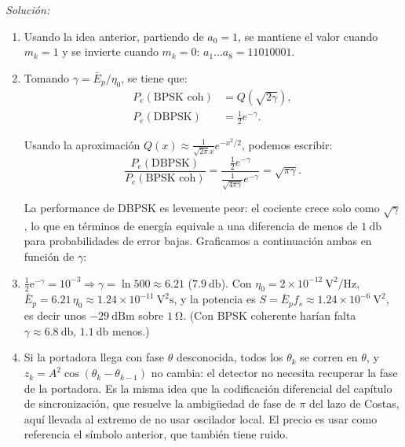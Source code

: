 \documentclass[a4paper,11pt]{article}
\newcommand{\e}{\mathrm{e}}
\newenvironment{solucion}[1][]{
\noindent \large \textsl{Solución:} \ifthenelse{\equal{#1}{}}{}{\emph{(#1)}}

\smallskip
}{
\bigskip
}
\begin{document}
\begin{solucion}
\begin{enumerate}
                \item Usando la idea anterior, partiendo de $a_0=1$, se mantiene el valor cuando $m_k=1$ y se invierte cuando $m_k=0$: $a_1\ldots a_8 = 11010001$.
                
                \item Tomando $\gamma = \bar{E}_p/\eta_0$, se tiene que:
                 \begin{align*}
                        P_e(\text{BPSK coh}) &= Q(\sqrt{2\gamma}), \\
                        P_e(\text{DBPSK} ) &= \frac{1}{2} e^{-\gamma}.
                 \end{align*}
                
                 Usando la aproximación $Q(x) \approx \frac{1}{\sqrt{2\pi} x}e^{-x^2/2}$, podemos escribir:
                 \begin{equation*}
                        \frac{P_e(\text{DBPSK})}{P_e(\text{BPSK coh})} = \frac{\frac{1}{2}e^{-\gamma}}{\frac{1}{\sqrt{4\pi\gamma}}e^{-\gamma}} = \sqrt{\pi\gamma}.
                 \end{equation*}
                 
                 La performance de DBPSK es levemente peor: el cociente crece solo como $\sqrt{\gamma}$, lo que en términos de energía equivale a una diferencia de menos de $1\ \unit{\decibel}$ para probabilidades de error bajas. Graficamos a continuación ambas en función de $\gamma$:
                 \begin{center}
                        
                 \end{center}

                \item $\frac12\e^{-\gamma}=10^{-3}\Rightarrow \gamma=\ln 500\approx 6.21$ ($7.9\ \unit{\decibel}$). Con $\eta_0=2\times10^{-12}\ \unit{\square\volt/\hertz}$, $\bar E_p=6.21\,\eta_0\approx 1.24\times10^{-11}\ \unit{\square\volt\second}$, y la potencia es $S=\bar E_p f_s\approx 1.24\times10^{-6}\ \unit{\square\volt}$, es decir unos $-29\ \mathrm{dBm}$ sobre $1\ \unit{\ohm}$. (Con BPSK coherente harían falta $\gamma\approx 6.8\ \unit{\decibel}$, $1.1\ \unit{\decibel}$ menos.)

                \item Si la portadora llega con fase $\theta$ desconocida, todos los $\theta_k$ se corren en $\theta$, y $z_k=A^2\cos(\theta_k-\theta_{k-1})$ no cambia: el detector no necesita recuperar la fase de la portadora. Es la misma idea que la codificación diferencial del capítulo de sincronización, que resuelve la ambigüedad de fase de $\pi$ del lazo de Costas, aquí llevada al extremo de no usar oscilador local. El precio es usar como referencia el símbolo anterior, que también tiene ruido.
        \end{enumerate}
        
\end{solucion}
\end{document}
